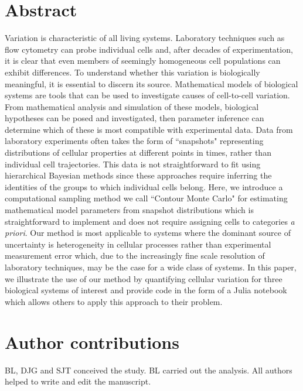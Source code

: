 \documentclass[10pt,letterpaper]{article}
\begin{document}
\newpage
\linenumbers
\section{Abstract}
Variation is characteristic of all living systems. Laboratory techniques such as flow cytometry can probe individual cells and, after decades of experimentation, it is clear that even members of seemingly homogeneous cell populations can exhibit differences. To understand whether this variation is biologically meaningful, it is essential to discern its source. Mathematical models of biological systems are tools that can be used to investigate causes of cell-to-cell variation. From mathematical analysis and simulation of these models, biological hypotheses can be posed and investigated, then parameter inference can determine which of these is most compatible with experimental data. Data from laboratory experiments often takes the form of ``snapshots" representing distributions of cellular properties at different points in times, rather than individual cell trajectories. This data is not straightforward to fit using hierarchical Bayesian methods since these approaches require inferring the identities of the groups to which individual cells belong. Here, we introduce a computational sampling method we call ``Contour Monte Carlo" for estimating mathematical model parameters from snapshot distributions which is straightforward to implement and does not require assigning cells to categories \emph{a priori}. Our method is most applicable to systems where the dominant source of uncertainty is heterogeneity in cellular processes rather than experimental measurement error which, due to the increasingly fine scale resolution of laboratory techniques, may be the case for a wide class of systems. In this paper, we illustrate the use of our method by quantifying cellular variation for three biological systems of interest and provide code in the form of a Julia notebook which allows others to apply this approach to their problem.







\section{Author contributions}
BL, DJG and SJT conceived the study. BL carried out the analysis. All authors helped to write and edit the manuscript.


\nolinenumbers



\end{document}
